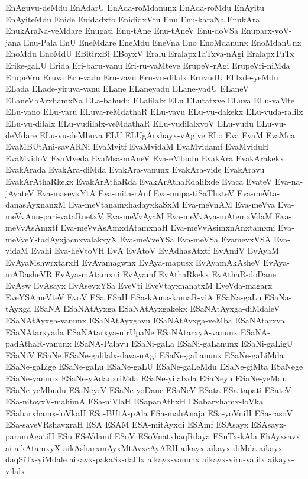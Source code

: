 {EnAguvu-deMdu
EnAdarU
EnAda-roMdanunx
EnAda-roMdu
EnAyitu
EnAyiteMdu
Enide
Enidadxto
EnididxVtu
Enu
Enu-karaNa
EnukAra
EnukAraNa-veMdare
Enugati
Enu-tAne
Enu-tAneV
Enu-doVSa
Enuparx-yoV-jana
Enu-Pala
EnU
EneMdare
EneMdu
EneVna
Eno
EnoMdanunx
EnoMdanUnx
EnoMdu
EnoMdU
EBitirxBi
EBoyxV
Eralu
EralapxTaTxva-nAgi
EralapxTuTx
Erike-gaLU
Erida
Eri-baru-vanu
Eri-ru-vaMteye
ErupeV-rAgi
ErupeVri-niMda
ErupeVru
Eruva
Eru-vadu
Eru-vavu
Eru-vu-dilalx
EruvudU
Elilxde-yeMdu
ELada
ELade-yiruva-vanu
ELane
ELaneyadu
ELane-yadU
ELaneV
ELaneVbArxhamxNa
ELa-bahudu
ELalilalx
ELu
ELutatxve
ELuva
ELu-vaMte
ELu-vano
ELu-varu
ELuva-reMdathaR
ELu-vavu
ELu-vu-dakekx
ELu-vuda-ralilx
ELu-vu-dilalx
ELu-vudilalx-veMdathaR
ELu-vudilalxvoV
ELu-vudu
ELu-vu-deMdare
ELu-vu-deMbuva
ELU
ELUgArxhayx-vAgive
ELo
Eva
EvaM
EvaMca
EvaMBUtAni-savARNi
EvaMvitf
EvaMvidaM
EvaMvidamf
EvaMviduH
EvaMvidoV
EvaMveda
EvaMsa-mAneV
Eva-eMbudu
EvakAra
EvakArakekx
EvakArada
EvakAra-diMda
EvakAra-vanunx
EvakAra-vide
EvakAravu
EvakArAthaRkekx
EvakArAthaRda
EvakArAthaRdalilxde
Evaca
EvateV
Eva-na-jAyateV
Eva-maseyxYtA
Eva-mita-rAnf
Eva-mupa-tiSaThxteV
Eva-meVta-danasAyxnanxM
Eva-meVtanamxhadayxkaSxM
Eva-meVnAM
Eva-meVva
Eva-meVvAnu-pari-vataRnetxV
Eva-meVvAyaM
Eva-meVvAya-mAtemxVdaM
Eva-meVvAsAmxtf
Eva-meVvAsAmxdAtamxnaH
Eva-meVvAsimxnAnxtamxni
Eva-meVveY-tadAyxjacnxvalakxyX
Eva-meVveYSa
Eva-meVSa
EvamevxVSA
Eva-vidaM
Evahi
Eva-heVtoVH
EvA
EvAtoV
EvAdhasAtxtf
EvAmiV
EvAyaM
EvAyaMshwrxtarxH
EvAyamagwnx
EvAya-mapusx
EvAyamAkAsheV
EvAya-mADasheVR
EvAya-mAtamxni
EvAyamf
EvAthaRkekx
EvAthaR-doDane
EvAsw
EvAsayx
EvAseyxYSa
EveVti
EveVtayxnanatxM
EveVda-magarx
EveYSAmeVteV
EvoV
ESa
ESaH
ESa-kAma-kamaR-viA
ESaNa-gaLu
ESaNa-tAyxga
ESaNA
ESaNAtAyxga
ESaNAtAyxgakekx
ESaNAtAyxga-diMdaleV
ESaNAtAyxga-vanunx
ESaNAtAyxgavu
ESaNAtAyxga-veMba
ESaNAtarxya
ESaNAtarxyada
ESaNAtarxya-nirUpaNe
ESaNAtarxyA-vanunx
ESaNA-padAthaR-vanunx
ESaNA-Palavu
ESaNi-gaLa
ESaNi-gaLanunx
ESaNi-gaLigU
ESaNiV
ESaNe
ESaNe-galilalx-dava-nAgi
ESaNe-gaLanunx
ESaNe-gaLiMda
ESaNe-gaLige
ESaNe-gaLu
ESaNe-gaLU
ESaNe-gaLeMdu
ESaNe-giMta
ESaNege
ESaNe-yanunx
ESaNe-yAdadxriMda
ESaNe-yilalxda
ESaNeyu
ESaNe-yeMdu
ESaNe-yeMbudu
ESaNeyeV
ESaNe-yoDane
ESaNeV
ESata
ESa-tapati
ESateV
ESa-nitoyxV-mahimA
ESa-niVlaH
ESapanAthxH
ESabarxhamx-loVka
ESabarxhamx-loVkaH
ESa-BUtA-pAla
ESa-mahAnaja
ESa-yoVniH
ESa-rasoV
ESa-saveVRshavxraH
ESA
ESAM
ESA-mitAyxdi
ESAmf
ESAsayx
ESAsayx-paramAgatiH
ESu
ESeVdamf
ESoV
ESoVnatxhaqRdaya
ESuTx-kAla
EhAyxsavx
ai
aikAtamxyX
aikAsharxmAyxMtAvxcAyARH
aikayx
aikayx-diMda
aikayx-daqSiTx-yiMdale
aikayx-pakaSx-dalilx
aikayx-vanunx
aikayx-viru-valilx
aikayx-vilalx
}
